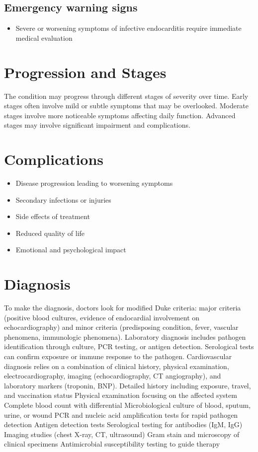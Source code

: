 \subsection{Emergency warning signs}
\begin{itemize}[noitemsep]
  \item Severe or worsening symptoms of infective endocarditis require immediate medical evaluation
\end{itemize}
\section{Progression and Stages}
The condition may progress through different stages of severity over time. Early stages often involve mild or subtle symptoms that may be overlooked. Moderate stages involve more noticeable symptoms affecting daily function. Advanced stages may involve significant impairment and complications.
\section{Complications}
\begin{itemize}[noitemsep]
  \item Disease progression leading to worsening symptoms
  \item Secondary infections or injuries
  \item Side effects of treatment
  \item Reduced quality of life
  \item Emotional and psychological impact
\end{itemize}
\section{Diagnosis}
To make the diagnosis, doctors look for modified Duke criteria: major criteria (positive blood cultures, evidence of endocardial involvement on echocardiography) and minor criteria (predisposing condition, fever, vascular phenomena, immunologic phenomena). Laboratory diagnosis includes pathogen identification through culture, PCR testing, or antigen detection. Serological tests can confirm exposure or immune response to the pathogen. Cardiovascular diagnosis relies on a combination of clinical history, physical examination, electrocardiography, imaging (echocardiography, CT angiography), and laboratory markers (troponin, BNP). Detailed history including exposure, travel, and vaccination status Physical examination focusing on the affected system Complete blood count with differential Microbiological culture of blood, sputum, urine, or wound PCR and nucleic acid amplification tests for rapid pathogen detection Antigen detection tests Serological testing for antibodies (IgM, IgG) Imaging studies (chest X-ray, CT, ultrasound) Gram stain and microscopy of clinical specimens Antimicrobial susceptibility testing to guide therapy

